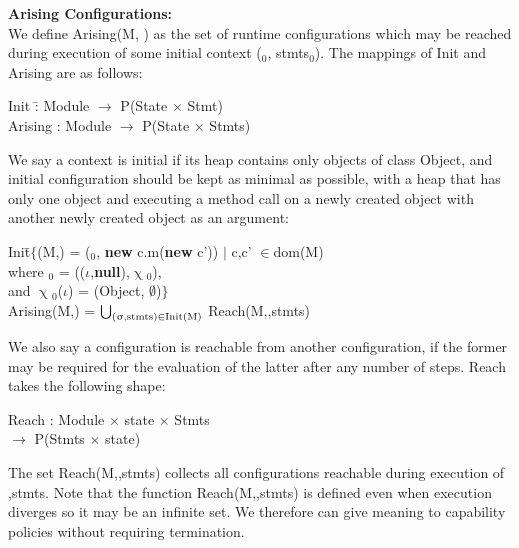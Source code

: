 \documentclass[a4paper,11pt,twoside]{article}
\newenvironment{logic}
{\begin{minipage}[c]{\linewidth}  \sffamily \mdseries \begin{tabbing}}
{\end{tabbing}\end{minipage}\vspace{0.3em}}
\newcommand{\loin}{$\in$}
\newcommand{\losigma}{\text{$\upsigma$}}
\newcommand{\lochi}{$\upchi$}
\newcommand{\ablock} {\null\qquad}
\begin{document}
\textbf{Arising Configurations:}\\
We define Arising(M, \losigma) as the set of runtime configurations which may be reached during execution of some initial context (\losigma$_0$, stmts$_0$). The mappings of Init and Arising are as follows:\\

\begin{logic}
Init \ablock \=: Module $\rightarrow$ P(State $\times$ Stmt)\\
Arising \>: Module $\rightarrow$ P(State $\times$ Stmts)\\
\end{logic}

We say a context is initial if its heap contains only objects of class Object, and initial configuration should be kept as minimal as possible, with a heap that has only one object and executing a method call on a newly created object with another newly created object as an argument:\\

\begin{logic}
Init\=$\{$(M,\losigma) = (\losigma$_0$, \textbf{new} c.m(\textbf{new} c')) $|$ c,c' \loin dom(M)\\ \> where \losigma$_0$ = (($\iota$,\textbf{null}),\lochi$_0$),\\
\>and \lochi$_0$($\iota$) = (Object, $\emptyset$)$\}$\\
Arising(M,\losigma) = $\bigcup_{\text{(\losigma,stmts)\loin Init(M)}}$ Reach(M,\losigma,stmts)\\
\end{logic}

We also say a configuration is reachable from another configuration, if the former may be required for the evaluation of the latter after any number of steps. Reach takes the following shape:\\

\begin{logic}
Reach : Module $\times$ state $\times$ Stmts\\
\null\qquad $\rightarrow$ P(Stmts $\times$ state)\\
\end{logic}

The set Reach(M,\losigma,stmts) collects all configurations reachable during execution of \losigma,stmts. Note that the function Reach(M,\losigma,stmts) is defined even when execution diverges so it may be an infinite set. We therefore can give meaning to capability policies without requiring termination.\\
\end{document}
